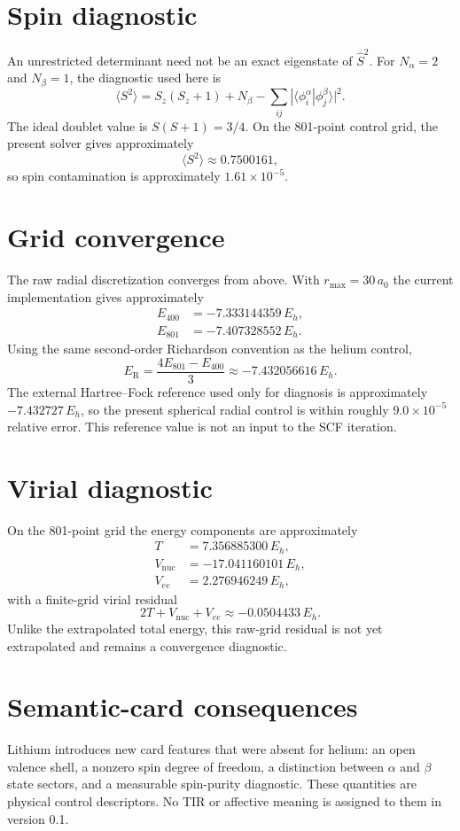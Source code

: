 \section{Spin diagnostic}
An unrestricted determinant need not be an exact eigenstate of $\hat S^2$. For $N_\alpha=2$ and $N_\beta=1$, the diagnostic used here is
\begin{equation}
\langle S^2\rangle=S_z(S_z+1)+N_\beta-
\sum_{ij}|\langle\phi_i^\alpha|\phi_j^\beta\rangle|^2.
\end{equation}
The ideal doublet value is $S(S+1)=3/4$. On the 801-point control grid, the present solver gives approximately
\begin{equation}
\langle S^2\rangle\approx0.7500161,
\end{equation}
so spin contamination is approximately $1.61\times10^{-5}$.

\section{Grid convergence}
The raw radial discretization converges from above. With $r_{\max}=30\,a_0$ the current implementation gives approximately
\begin{align}
E_{400}&=-7.333144359\,E_h,\\
E_{801}&=-7.407328552\,E_h.
\end{align}
Using the same second-order Richardson convention as the helium control,
\begin{equation}
E_{\mathrm{R}}=\frac{4E_{801}-E_{400}}{3}
\approx -7.432056616\,E_h.
\end{equation}
The external Hartree--Fock reference used only for diagnosis is approximately $-7.432727\,E_h$, so the present spherical radial control is within roughly $9.0\times10^{-5}$ relative error. This reference value is not an input to the SCF iteration.

\section{Virial diagnostic}
On the 801-point grid the energy components are approximately
\begin{align}
T&=7.356885300\,E_h,\\
V_{\mathrm{nuc}}&=-17.041160101\,E_h,\\
V_{ee}&=2.276946249\,E_h,
\end{align}
with a finite-grid virial residual
\begin{equation}
2T+V_{\mathrm{nuc}}+V_{ee}\approx-0.0504433\,E_h.
\end{equation}
Unlike the extrapolated total energy, this raw-grid residual is not yet extrapolated and remains a convergence diagnostic.

\section{Semantic-card consequences}
Lithium introduces new card features that were absent for helium: an open valence shell, a nonzero spin degree of freedom, a distinction between $\alpha$ and $\beta$ state sectors, and a measurable spin-purity diagnostic. These quantities are physical control descriptors. No TIR or affective meaning is assigned to them in version 0.1.
